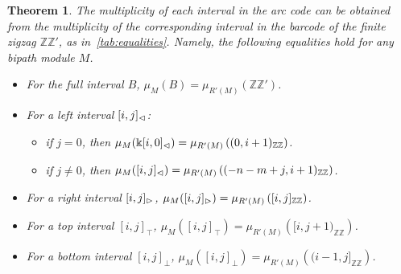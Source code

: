 \documentclass[a4paper,english,reqno]{amsart}
\renewcommand\k{\Bbbk}
\newcommand\ZZ{\mathbb{ZZ}}
\theoremstyle{plain}
\newtheorem{theorem}{Theorem}[section]
\theoremstyle{definition} %
\newcommand{\slice}[1]{{#1}'} %
\begin{document}
\begin{theorem}\label{thm:main-theorem}
The multiplicity of each interval in the arc code can be obtained from the multiplicity of the corresponding interval in the barcode of the finite zigzag $\slice{\ZZ}$, as in~\cref{tab:equalities}. Namely, the following equalities hold for any bipath module $M$.

\begin{itemize}
    \item For the full interval $B$, $\mu_M(B) = \mu_{\slice{R}(M)}(\slice{\ZZ})$.
    \item For a left interval $[i,j]_{\vartriangleleft}$:
\begin{itemize}
    \item if $j=0$, then $\mu_M(\k [i, 0]_{\lefti}) = \mu_{\slice{R}(M)}\left((0, i + 1)_{\ZZ}\right)$.
    \item if $j\neq 0$, then $\mu_M([i, j]_{\lefti}) = \mu_{\slice{R}(M)}\left((- n - m + j, i + 1)_{\ZZ}\right)$.
\end{itemize}  
    \item For a right interval $[i, j]_{\vartriangleright}$, $\mu_M([i,j]_{\righti}) = \mu_{\slice{R}(M)}\left([i, j]_{\ZZ}\right)$.
    \item For a top interval $[i, j]_{\top}$, $\mu_M([i,j]_{\top}) = \mu_{\slice{R}(M)}\left([i, j + 1)_{\ZZ}\right)$.
    \item For a bottom interval $[i, j]_{\bot}$, $\mu_M([i,j]_{\bot}) = \mu_{\slice{R}(M)}\left((i - 1, j]_{\ZZ}\right)$.
  \end{itemize}
\end{theorem}
\end{document}
